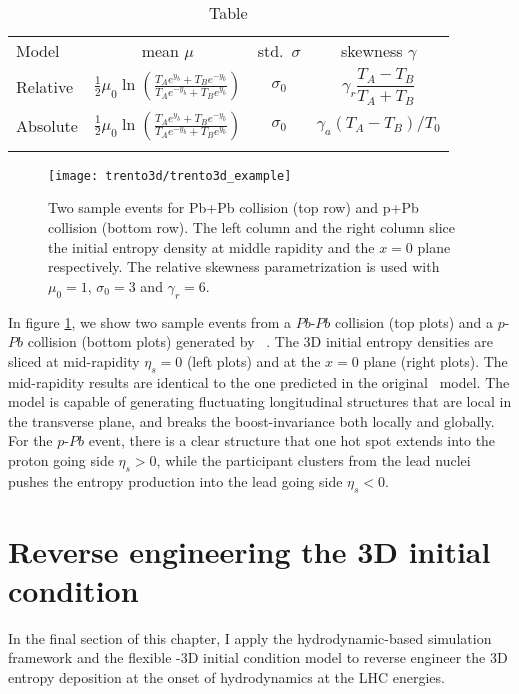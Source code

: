 \begin{table}
\centering
\caption{Table}\label{tab:parametrization}
\begin{tabular}{lccc}
\paddedhline
Model & mean $\mu$ & std.\ $\sigma$ & skewness $\gamma$ \\
\paddedhline \noalign{\smallskip}
Relative  & $\frac{1}{2} \mu_0 \ln\left(\frac{T_A e^{y_b}+T_B e^{-y_b}}{T_A e^{-y_b} + T_B e^{y_b}}\right)$ & $\sigma_0$ & $\gamma_r \dfrac{T_A - T_B}{T_A + T_B}$ \smallskip\\
Absolute & $\frac{1}{2} \mu_0 \ln\left(\frac{T_A e^{y_b}+T_B e^{-y_b}}{T_A e^{-y_b} + T_B e^{y_b}}\right)$  & $\sigma_0$ & $\gamma_a (T_A - T_B)/T_0$\smallskip\\
\paddedhline 
\end{tabular}
\end{table}

\begin{figure}
\centering
\texttt{[image: trento3d/trento3d\_example]}
\caption{Two sample events for Pb+Pb collision (top row) and p+Pb collision (bottom row). The left column and the right column slice the initial entropy density at middle rapidity and the $x=0$ plane respectively. The relative skewness parametrization is used with $\mu_0=1$, $\sigma_0=3$ and $\gamma_r=6$.}
\label{fig:3d-example}
\end{figure}

In figure \ref{fig:3d-example}, we show two sample events from a $Pb$-$Pb$ collision (top plots) and a $p$-$Pb$ collision (bottom plots) generated by \trento\ .
The 3D initial entropy densities are sliced at mid-rapidity $\eta_s=0$ (left plots) and at the $x=0$ plane (right plots).
The mid-rapidity results are identical to the one predicted in the original \trento\ model.
The model is capable of generating fluctuating longitudinal structures that are local in the transverse plane, and breaks the boost-invariance both locally and globally.
For the $p$-$Pb$ event, there is a clear structure that one hot spot extends into the proton going side $\eta_s >0$, while the participant clusters from the lead nuclei pushes the entropy production into the lead going side $\eta_s <0$.

\section{Reverse engineering the 3D initial condition}
In the final section of this chapter, I apply the hydrodynamic-based simulation framework and the flexible \trento-3D initial condition model to reverse engineer the 3D entropy deposition at the onset of hydrodynamics at the LHC energies.

